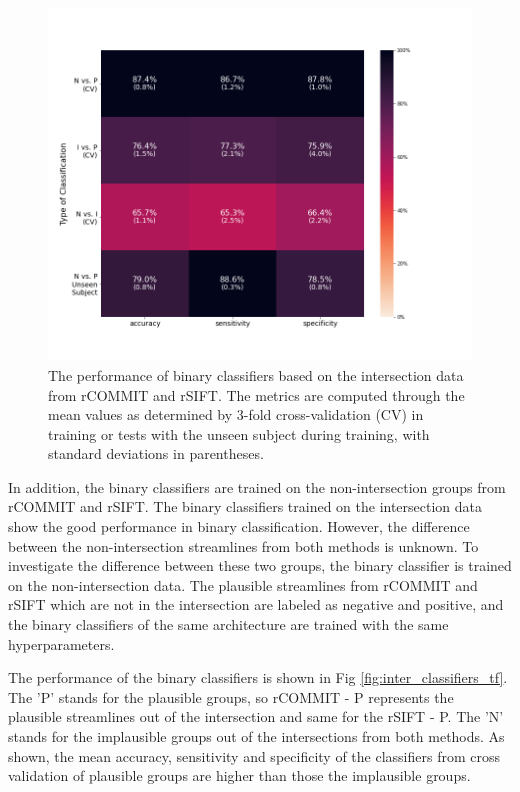 \begin{figure}[ht]
    \centering
    \includegraphics[width= 12cm]{figures/inter_classifiers.png}
    \caption{The performance of binary classifiers based on the intersection data from rCOMMIT and rSIFT.
    The metrics are computed through the mean values as determined by 3-fold cross-validation (CV) in training or tests with the unseen subject during training, 
    with standard deviations in parentheses.}
\label{fig:inter_classifiers}
\end{figure}

In addition, the binary classifiers are trained on the non-intersection groups from rCOMMIT and rSIFT.
The binary classifiers trained on the intersection data show the good performance in binary classification.
However, the difference between the non-intersection streamlines from both methods is unknown.
To investigate the difference between these two groups, the binary classifier is trained on the non-intersection data.
The plausible streamlines from rCOMMIT and rSIFT which are not in the intersection are labeled as 
negative and positive, and the binary classifiers of the same architecture are trained with the same hyperparameters. 

The performance of the binary classifiers is shown in Fig \ref{fig:inter_classifiers_tf}.
The 'P' stands for the plausible groups, so rCOMMIT - P represents the plausible streamlines out of the intersection and same for the rSIFT - P. 
The 'N' stands for the implausible groups out of the intersections from both methods.
As shown, the mean accuracy, sensitivity and specificity of the classifiers from cross validation of plausible groups are higher than those the implausible groups.


